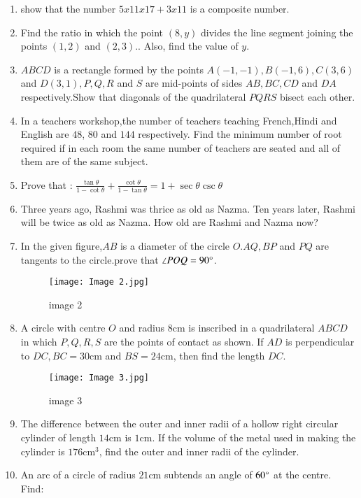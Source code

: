 \documentclass[12pt,-letter paper]{article}
\providecommand{\brak}[1]{\ensuremath{\left(#1\right)}}
\begin{document}
\begin{enumerate}
\item show that the number $5x11x17+3x11$ is a composite number.
\item Find the ratio in which the point $\brak{8, y}$ divides the line segment joining the points $\brak{1, 2}$ and $\brak{2, 3}$.. Also, find the value of  $y$.
\newpage
\item $ABCD$ is a rectangle formed by the points $ A\brak{-1,-1}, B\brak{-1, 6}, C\brak{3, 6}$ and $D\brak{3, 1}, P, Q, R$ and $S$ are mid-points of sides $AB, BC, CD$ and $DA$ respectively.Show that diagonals of the quadrilateral $PQRS$ bisect each other.
\item In a teachers workshop,the number of teachers teaching French,Hindi and English are $48$, $80$ and $144$ respectively. Find the minimum number of root required if in each room the same number of teachers are seated and all of them are of the same subject.
\item Prove that : $\frac{\tan{\theta}}{1 - \cot{\theta}} + \frac{\cot{\theta}}{1 - \tan{\theta}} = 1 + \sec{\theta}\csc{\theta}$
\item Three years ago, Rashmi was thrice as old as Nazma. Ten years later, Rashmi will be twice as old as Nazma. How old are Rashmi and Nazma now?
\item In the given figure,$AB$ is a diameter of the circle $O. AQ, BP$ and $PQ$ are tangents to the circle.prove that $\angle POQ = 90\degree$.
\begin{figure}[!ht]
\centering
\texttt{[image: Image 2.jpg]}
\label{fig:Image 2}
\caption{image 2}
\end{figure}
\item  A circle with centre $O$ and radius $8\mathrm{cm}$ is inscribed in a quadrilateral $ABCD$ in which $P, Q, R, S$ are the points of contact as shown. If $AD$ is perpendicular to $DC, BC = 30\mathrm{cm}$ and $BS = 24\mathrm{cm}$, then find the length $DC$.
\begin{figure}[!ht]
\centering
\texttt{[image: Image 3.jpg]}
\label{fig:Image 3}
\caption{image 3}
\end{figure}
\item The difference between the outer and inner radii of a hollow right circular cylinder of length $14\mathrm{cm}$ is $1\mathrm{cm}$. If the volume of the metal used in making the cylinder is $176\mathrm{cm}^3$, find the outer and inner radii of the cylinder.
\newpage
\item An arc of a circle of radius $21\mathrm{cm}$ subtends an angle of $60\degree$ at the centre. Find:

\end{enumerate}
\end{document}
